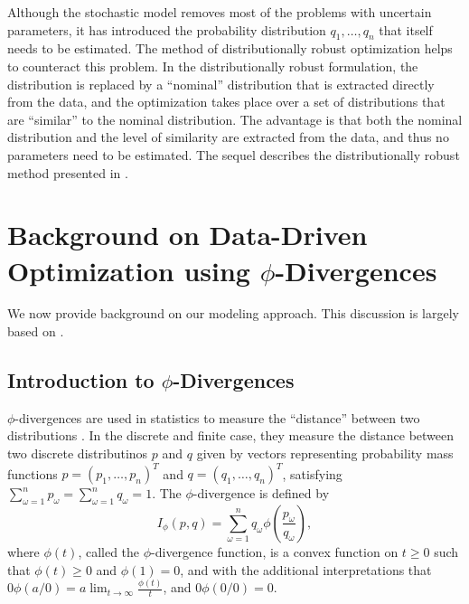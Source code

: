 \documentclass[opre,nonblindrev]{informs3} %
\newcommand{\plp}{$\phi$LP-2}
\begin{document}
Although the stochastic model removes most of the problems with uncertain parameters, it has introduced the probability distribution $q_1, \dots, q_n$ that itself needs to be estimated.
The method of distributionally robust optimization helps to counteract this problem.
In the distributionally robust formulation, the distribution is replaced by a ``nominal'' distribution that is extracted directly from the data, and the optimization takes place over a set of distributions that are ``similar'' to the nominal distribution.
The advantage is that both the nominal distribution and the level of similarity are extracted from the data, and thus no parameters need to be estimated.
The sequel describes the distributionally robust method presented in \citep{love2013phi}.



\section{Background on Data-Driven Optimization using $\phi$-Divergences}
\label{sec:phi_divergences}

We now provide background on our modeling approach.
This discussion is largely based on \citep{love2013phi}.

\subsection{Introduction to $\phi$-Divergences}

$\phi$-divergences are used in statistics to measure the ``distance'' between two distributions \citep{pardo2005statistical}. 
In the discrete and finite case, they measure the distance between two discrete distributinos $p$ and $q$ given by vectors representing probability mass functions $p = (p_1, \dots, p_n)^T$ and $q = (q_1, \dots, q_n)^T$, satisfying $\sum_{\omega=1}^n p_\omega = \sum_{\omega=1}^n q_\omega = 1$.
The $\phi$-divergence is defined by
\[
	I_\phi(p,q) = \sum_{\omega=1}^n q_\omega \phi\left(\frac{p_\omega}{q_\omega}\right),
\]
where $\phi(t)$, called the $\phi$-divergence function, is a convex function on $t \geq 0$ such that $\phi(t) \geq 0$ and $\phi(1) = 0$, and with the additional interpretations that $0 \phi(a/0) = a \lim_{t \rightarrow \infty} \frac{\phi(t)}{t}$, and $0 \phi(0/0) = 0$.
\end{document}
